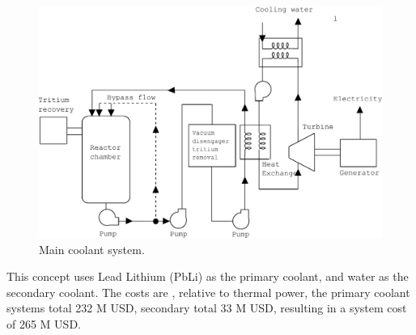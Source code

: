 \begin{figure}[h!]  
\centering  
\includegraphics[width=0.8\linewidth]{StandardFigures/steamPbLi-eps-converted-to.pdf}
\caption{Main coolant system.}
\label{fig:coola}
\end{figure} 

This concept uses Lead Lithium (PbLi) as the primary coolant, and water as the secondary coolant.  The costs are , relative to thermal power, the primary coolant systems total 232 M USD, secondary total 33 M USD, resulting in a system cost of 265 M USD. 
